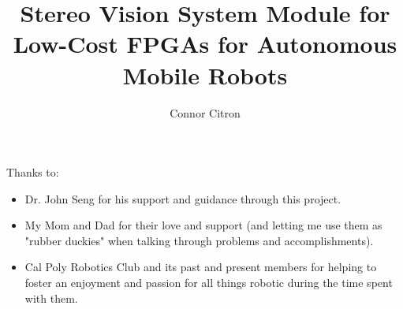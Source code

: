 \documentclass[12pt]{ucthesis}
\begin{document}

\title{Stereo Vision System Module for Low-Cost FPGAs for Autonomous Mobile Robots}
\author{Connor Citron}
  
 
     

\maketitle

\begin{frontmatter}

\copyrightpage

\committeemembershippage

\renewcommand{\abstractname}{ABSTRACT}
\begin{abstract}

\end{abstract}

\renewcommand{\acknowledgename}{ACKNOWLEDGMENTS}
\begin{acknowledgements}

\noindent
Thanks to:
\begin{itemize}
	\item Dr. John Seng for his support and guidance through this project.
	\item My Mom and Dad for their love and support (and letting me use them as "rubber duckies" when talking through problems and accomplishments).
	\item Cal Poly Robotics Club and its past and present members for helping to foster an enjoyment and passion for all things robotic during the time spent with them.
\end{itemize}

\end{acknowledgements}

\renewcommand{\contentsname}{TABLE OF CONTENTS}
\tableofcontents

\renewcommand{\listtablename}{LIST OF TABLES}
\listoftables

\renewcommand{\listfigurename}{LIST OF FIGURES}
\listoffigures

\end{frontmatter}
\end{document}
